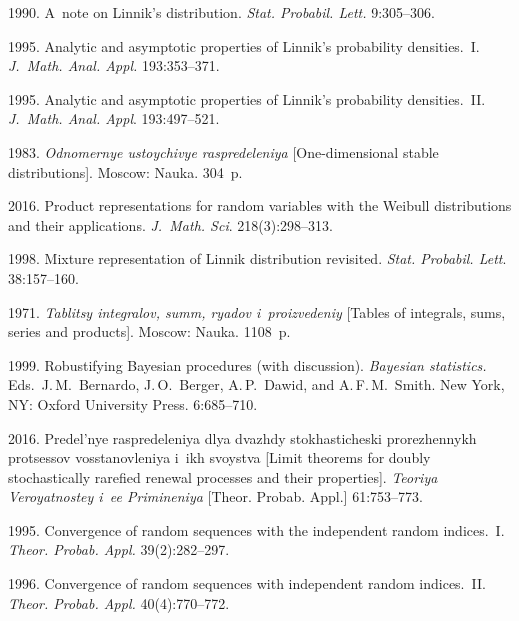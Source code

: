 \begin{multicols}{2}
{{\begin{thebibliography}{99}
 1990. A~note on Linnik's distribution. \textit{Stat.
Probabil. Lett.} 9:305--306.

 1995. Analytic and asymptotic
properties of Linnik's probability densities.~I. \textit{J.~Math. Anal. 
Appl.} 193:353--371.

 1995. Analytic and asymptotic
properties of Linnik's probability densities.~II. \textit{J.~Math. Anal.
 Appl}. 193:497--521.

 1983. \textit{ Odnomernye ustoychivye raspredeleniya}
[One-dimensional stable distributions]. Moscow: Nauka. 304~p.

 2016. Product representations for random variables with the
Weibull distributions and their applications. \textit{J.~Math. Sci}. 218(3):298--313.

 1998. Mixture representation
of Linnik distribution revisited. \textit{Stat. Probabil. Lett}. 38:157--160.

 1971. \textit{Tablitsy integralov, summ,
ryadov i~proizvedeniy} [Tables of integrals, sums, series and
products]. Moscow: Nauka. 1108~p.

 1999. Robustifying Bayesian
procedures (with discussion). 
\textit{Bayesian statistics.} Eds.\ J.\,M.~Bernardo, J.\,O.~Berger, A.\,P.~Dawid, 
and A.\,F.\,M.~Smith.
New York, NY: Oxford University Press. 6:685--710.

 2016. Predel'nye raspredeleniya dlya dvazhdy stokhasticheski
prorezhennykh protsessov vosstanovleniya i~ikh svoystva [Limit
theorems for doubly stochastically rarefied renewal processes and
their properties]. \textit{Teoriya Veroyatnostey i~ee Primineniya}
[Theor. Probab. Appl.] 61:753--773.

 1995. Convergence of random
sequences with the independent random indices.~I. \textit{Theor. Probab. Appl.}
39(2):282--297.

 1996. Convergence of random
sequences with independent random indices.~II. \textit{Theor. 
Probab. Appl.} 40(4):770--772.


\end{thebibliography}}}
\end{multicols}
